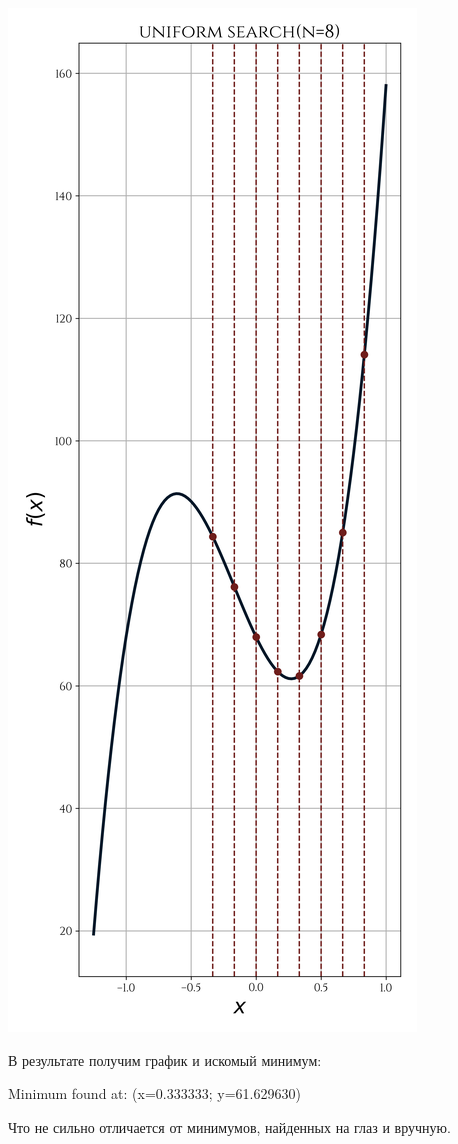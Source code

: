 \documentclass[a4paper, 14pt]{extarticle}
\begin{document}
\begin{minipage}{0.4\textwidth}
    \includegraphics[width=\linewidth]{uniform_search_f_plot(n=8)}
\end{minipage}
\hfill
\begin{minipage}{0.55\textwidth}
    В результате получим график и искомый минимум: 
    \begin{center}
        Minimum found at: (x=0.333333; y=61.629630)
    \end{center}

    Что не сильно отличается от минимумов, найденных \guillemotleft на глаз\guillemotright {} 
    и вручную.
\end{minipage}
\end{document}
